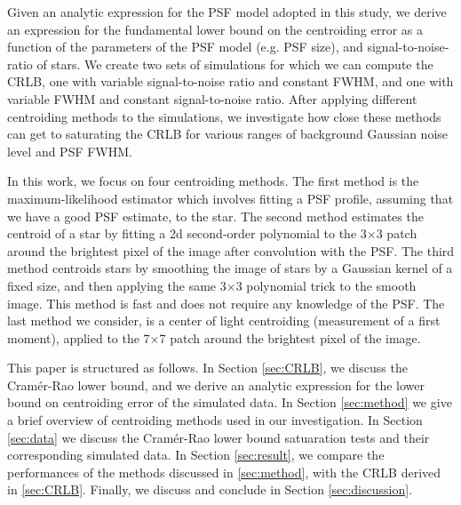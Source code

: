 \documentclass[12pt, preprint]{aastex}
\begin{document}

Given an analytic expression for the PSF model adopted in this study,
we derive an expression for the fundamental lower bound on the centroiding error as
a function of the parameters of the PSF model (e.g. PSF size),
and signal-to-noise-ratio of stars. We create two sets of simulations for which we can 
compute the CRLB, one with variable signal-to-noise ratio and constant FWHM, and one 
with variable FWHM and constant signal-to-noise ratio. After applying
different centroiding methods to the simulations,
we investigate how close these methods can get to saturating the CRLB for
various ranges of background Gaussian noise level and PSF FWHM.

In this work, we focus on four centroiding methods. The first method is the maximum-likelihood 
estimator which involves fitting a PSF profile, assuming that we have a good PSF estimate, to the star. 
The second method estimates the centroid of a star by fitting a 2d second-order polynomial to
 the 3$\times$3 patch around the brightest pixel of the image after convolution with the PSF. 
The third method centroids stars by
 smoothing the image of stars by a Gaussian kernel of a fixed size,
 and then applying the same 3$\times$3 polynomial trick to the smooth
 image. This method is fast and does not require any knowledge of the 
PSF. The last method we consider, is a center of light centroiding 
(measurement of a first moment), applied to the 
7$\times$7 patch around the brightest pixel of the image.

This paper is structured as follows. In Section \ref{sec:CRLB},
we discuss the Cram\'{e}r-Rao lower bound, and we derive
an analytic expression for the lower bound on centroiding error
of the simulated data. 
In Section \ref{sec:method} we give a brief overview of 
centroiding methods used in our investigation.
In Section \ref{sec:data} we discuss the Cram\'{e}r-Rao lower bound satuaration
tests and their corresponding simulated data.
In Section \ref{sec:result}, we compare the performances of the methods
discussed in \ref{sec:method}, with the CRLB derived in \ref{sec:CRLB}. Finally,
 we discuss and conclude in Section \ref{sec:discussion}.               
\end{document}
